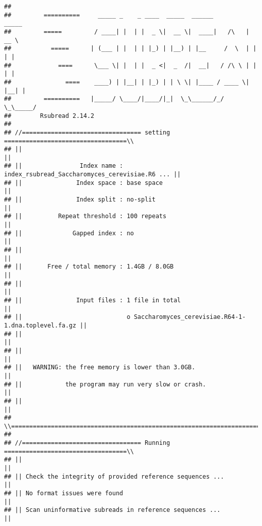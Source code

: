 \documentclass[
]{book}
\begin{document}
\begin{verbatim}
## 
##         ==========     _____ _    _ ____  _____  ______          _____  
##         =====         / ____| |  | |  _ \|  __ \|  ____|   /\   |  __ \ 
##           =====      | (___ | |  | | |_) | |__) | |__     /  \  | |  | |
##             ====      \___ \| |  | |  _ <|  _  /|  __|   / /\ \ | |  | |
##               ====    ____) | |__| | |_) | | \ \| |____ / ____ \| |__| |
##         ==========   |_____/ \____/|____/|_|  \_\______/_/    \_\_____/
##        Rsubread 2.14.2
## 
## //================================= setting ==================================\\
## ||                                                                            ||
## ||                Index name : index_rsubread_Saccharomyces_cerevisiae.R6 ... ||
## ||               Index space : base space                                     ||
## ||               Index split : no-split                                       ||
## ||          Repeat threshold : 100 repeats                                    ||
## ||              Gapped index : no                                             ||
## ||                                                                            ||
## ||       Free / total memory : 1.4GB / 8.0GB                                  ||
## ||                                                                            ||
## ||               Input files : 1 file in total                                ||
## ||                             o Saccharomyces_cerevisiae.R64-1-1.dna.toplevel.fa.gz ||
## ||                                                                            ||
## ||                                                                            ||
## ||   WARNING: the free memory is lower than 3.0GB.                            ||
## ||            the program may run very slow or crash.                         ||
## ||                                                                            ||
## \\============================================================================//
## 
## //================================= Running ==================================\\
## ||                                                                            ||
## || Check the integrity of provided reference sequences ...                    ||
## || No format issues were found                                                ||
## || Scan uninformative subreads in reference sequences ...                     ||

\end{verbatim}
\end{document}
